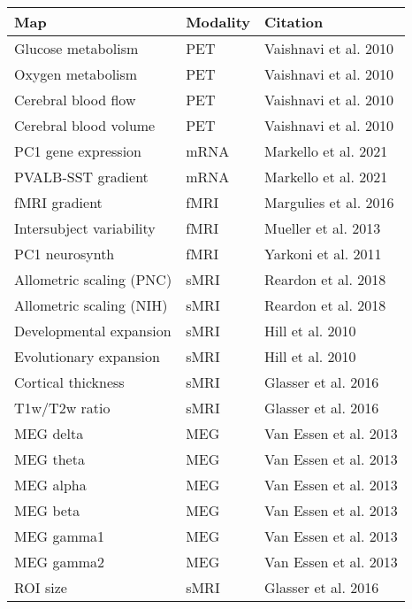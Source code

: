 \begin{longtable}{lll}
\toprule
Map & Modality & Citation \\ 
\midrule\addlinespace[2.5pt]
Glucose metabolism & PET & Vaishnavi et al. 2010 \\ 
Oxygen metabolism & PET & Vaishnavi et al. 2010 \\ 
Cerebral blood flow & PET & Vaishnavi et al. 2010 \\ 
Cerebral blood volume & PET & Vaishnavi et al. 2010 \\ 
PC1 gene expression & mRNA & Markello et al. 2021 \\ 
PVALB-SST gradient & mRNA & Markello et al. 2021 \\ 
fMRI gradient & fMRI & Margulies et al. 2016 \\ 
Intersubject variability & fMRI & Mueller et al. 2013 \\ 
PC1 neurosynth & fMRI & Yarkoni et al. 2011 \\ 
Allometric scaling (PNC) & sMRI & Reardon et al. 2018 \\ 
Allometric scaling (NIH) & sMRI & Reardon et al. 2018 \\ 
Developmental expansion & sMRI & Hill et al. 2010 \\ 
Evolutionary expansion & sMRI & Hill et al. 2010 \\ 
Cortical thickness & sMRI & Glasser et al. 2016 \\ 
T1w/T2w ratio & sMRI & Glasser et al. 2016 \\ 
MEG delta & MEG & Van Essen et al. 2013 \\ 
MEG theta & MEG & Van Essen et al. 2013 \\ 
MEG alpha & MEG & Van Essen et al. 2013 \\ 
MEG beta & MEG & Van Essen et al. 2013 \\ 
MEG gamma1 & MEG & Van Essen et al. 2013 \\ 
MEG gamma2 & MEG & Van Essen et al. 2013 \\ 
ROI size & sMRI & Glasser et al. 2016 \\ 
\bottomrule
\end{longtable}

